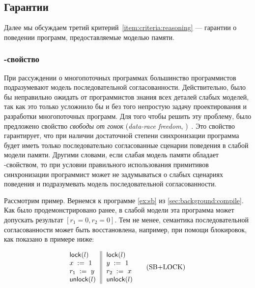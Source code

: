 \subsection{Гарантии}

Далее мы обсуждаем третий критерий~\ref{item:criteria:reasoning} ---
гарантии о поведении программ, предоставляемые моделью памяти.

\subsubsection{\DRF-свойство}
\label{sec:background:drf}

При рассуждении о многопоточных программах  
большинство программистов подразумевают 
модель последовательной согласованности. 
Действительно, было бы неправильно ожидать
от программистов знания всех деталей слабых моделей, 
так как это только усложнило бы и без того 
непростую задачу проектирования и разработки
многопоточных программ. 
Для того чтобы решить эту проблему, 
было предложено свойство \emph{свободы от гонок}
(\emph{data-race freedom}, \DRF)~\cite{Manson-al:POPL05}.
Это свойство гарантирует, что при наличии 
достаточной степени синхронизации программа будет иметь 
только последовательно согласованные сценарии поведения в слабой модели памяти. 
Другими словами, если слабая модель памяти обладает \DRF-свойством, 
то при условии правильного использования примитивов синхронизации
программист может не задумываться о слабых сценариях поведения 
и подразумевать модель последовательной согласованности.

Рассмотрим пример. 
Вернемся к программе \ref{ex:sb} из \cref{sec:background:compile}.
Как было продемонстрировано ранее, в слабой модели 
эта программа может допускать результат ${[r_1=0, r_2=0]}$.
Тем не менее, семантика последовательной согласованности
может быть восстановлена, например, при помощи блокировок, 
как показано в примере ниже:

\begin{equation*}
\inarrII{
   \lockInst{l}         \\
   \writeInst{}{x}{1}   \\
   \readInst{}{r_1}{y}  \\
   \unlockInst{l}       \\
}{
   \lockInst{l}         \\
   \writeInst{}{y}{1}   \\
   \readInst{}{r_2}{x}  \\
   \unlockInst{l}       \\
}
\tag{SB+LOCK}\label{ex:sb-lock}
\end{equation*}

